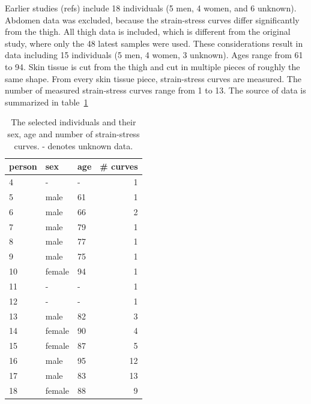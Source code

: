 Earlier studies (refs) include 18 individuals (5 men, 4 women, and 6 unknown).
Abdomen data was excluded, because the strain-stress curves differ significantly from the thigh.
All thigh data is included, which is different from the original study, where only the 48 latest samples were used.
These considerations result in data including 15 individuals (5 men, 4 women, 3 unknown).
Ages range from 61 to 94.
Skin tissue is cut from the thigh and cut in multiple pieces of roughly the same shape.
From every skin tissue piece, strain-stress curves are measured.
The number of measured strain-stress curves range from 1 to 13.
The source of data is summarized in table~\ref{tab:source_of_data}
\begin{table}
    \centering
    \caption[Source of data]{
        The selected individuals and their sex, age and number of strain-stress curves.
        - denotes unknown data.
    }
    \label{tab:source_of_data}
    \begin{tabular}{lllr}
        \toprule
        person & sex    & age & \# curves \\
        \midrule
        4      & -      & -   & 1         \\
        5      & male   & 61  & 1         \\
        6      & male   & 66  & 2         \\
        7      & male   & 79  & 1         \\
        8      & male   & 77  & 1         \\
        9      & male   & 75  & 1         \\
        10     & female & 94  & 1         \\
        11     & -      & -   & 1         \\
        12     & -      & -   & 1         \\
        13     & male   & 82  & 3         \\
        14     & female & 90  & 4         \\
        15     & female & 87  & 5         \\
        16     & male   & 95  & 12        \\
        17     & male   & 83  & 13        \\
        18     & female & 88  & 9         \\
        \bottomrule
    \end{tabular}
\end{table}

